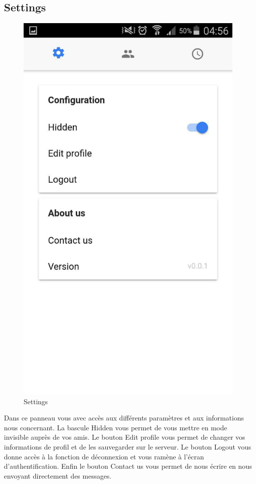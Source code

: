 \documentclass[french]{article}
\begin{document}
	
	\subsection{Settings}
	\begin{figure}[H]
		\centering
		\includegraphics[scale=0.4]{../screenshot/screenshot-settings}
		\caption{Settings}
		\label{Settings}
	\end{figure} 
	Dans ce panneau vous avec accès aux différents paramètres et aux informations nous concernant. La bascule Hidden vous permet de vous mettre en mode invisible auprès de vos amis. Le bouton Edit profile vous permet de changer vos informations de profil et de les sauvegarder sur le serveur.
	Le bouton Logout vous donne accès à la fonction de déconnexion et vous ramène à l'écran d'authentification. Enfin le bouton Contact us vous permet de nous écrire en nous envoyant directement des messages.
\end{document}

